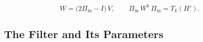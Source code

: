 \begin{equation}
    W = \bigl(2\Pi_{\mathrm{in}} - I\bigr)\,V,
    \qquad
    \Pi_{\mathrm{in}}\,W^{k}\,\Pi_{\mathrm{in}} = T_k(H') .
    \label{eq:walk}
\end{equation}

\subsection{The Filter and Its Parameters}
\label{sec:pipeline-filter}
